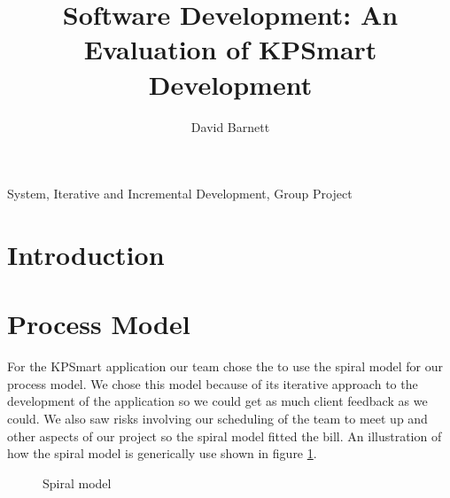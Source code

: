 \documentclass{style/CRPITStyle}
\begin{document}
\title{Software Development: An Evaluation of KPSmart Development}
\author{David Barnett}

\maketitle

\begin{abstract}
\end{abstract}

\vspace{.1in}

\/ System, Iterative and Incremental Development, Group Project

\vspace{.1in}

\section{Introduction}

\section{Process Model}

For the KPSmart application our team chose the to use the spiral model for our
process model. We chose this model because of its iterative approach to the
development of the application so we could get as much client feedback as we
could. We also saw risks involving our scheduling of the team to meet up and other aspects
of our project so the spiral model fitted the bill. An illustration of how the
spiral model is generically use shown in figure \ref{spiral-model}.

\vspace{.1in}

\begin{figure}[htb]
\caption{\protect\label{spiral-model} Spiral model }
\end{figure}
\end{document}
